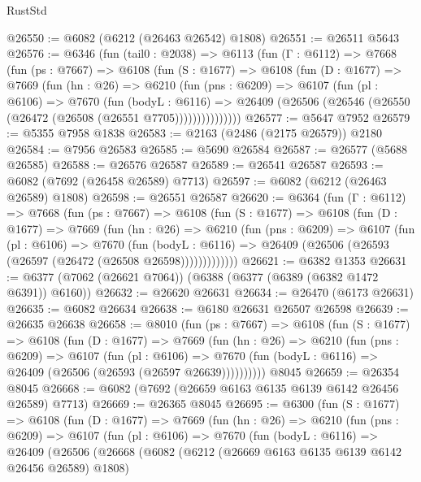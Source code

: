 \begin{lexlean}{RustStd}
\begin{coremodule}
@26550 := @6082 (@6212 (@26463 @26542) @1808)
@26551 := @26511 @5643
@26576 := @6346
    (fun (tail0 : @2038) =>
    @6113
      (fun (Γ : @6112) =>
      @7668
        (fun (ps : @7667) =>
        @6108
          (fun (S : @1677) =>
          @6108
            (fun (D : @1677) =>
            @7669
              (fun (hn : @26) =>
              @6210
                (fun (pns : @6209) =>
                @6107
                  (fun (pl : @6106) =>
                  @7670
                    (fun (bodyL : @6116) =>
                    @26409 (@26506 (@26546 (@26550 (@26472 (@26508 (@26551 @7705)))))))))))))))
@26577 := @5647 @7952
@26579 := @5355 @7958 @1838
@26583 := @2163 (@2486 (@2175 @26579)) @2180
@26584 := @7956 @26583
@26585 := @5690 @26584
@26587 := @26577 (@5688 @26585)
@26588 := @26576 @26587
@26589 := @26541 @26587
@26593 := @6082 (@7692 (@26458 @26589) @7713)
@26597 := @6082 (@6212 (@26463 @26589) @1808)
@26598 := @26551 @26587
@26620 := @6364
    (fun (Γ : @6112) =>
    @7668
      (fun (ps : @7667) =>
      @6108
        (fun (S : @1677) =>
        @6108
          (fun (D : @1677) =>
          @7669
            (fun (hn : @26) =>
            @6210
              (fun (pns : @6209) =>
              @6107
                (fun (pl : @6106) =>
                @7670
                  (fun (bodyL : @6116) =>
                  @26409 (@26506 (@26593 (@26597 (@26472 (@26508 @26598)))))))))))))
@26621 := @6382 @1353
@26631 := @6377 (@7062 (@26621 @7064)) (@6388 (@6377 (@6389 (@6382 @1472 @6391)) @6160))
@26632 := @26620 @26631
@26634 := @26470 (@6173 @26631)
@26635 := @6082 @26634
@26638 := @6180 @26631 @26507 @26598
@26639 := @26635 @26638
@26658 := @8010
    (fun (ps : @7667) =>
    @6108
      (fun (S : @1677) =>
      @6108
        (fun (D : @1677) =>
        @7669
          (fun (hn : @26) =>
          @6210
            (fun (pns : @6209) =>
            @6107
              (fun (pl : @6106) =>
              @7670 (fun (bodyL : @6116) => @26409 (@26506 (@26593 (@26597 @26639))))))))))
    @8045
@26659 := @26354 @8045
@26668 := @6082 (@7692 (@26659 @6163 @6135 @6139 @6142 @26456 @26589) @7713)
@26669 := @26365 @8045
@26695 := @6300
    (fun (S : @1677) =>
    @6108
      (fun (D : @1677) =>
      @7669
        (fun (hn : @26) =>
        @6210
          (fun (pns : @6209) =>
          @6107
            (fun (pl : @6106) =>
            @7670
              (fun (bodyL : @6116) =>
              @26409
                (@26506
                  (@26668
                    (@6082
                      (@6212 (@26669 @6163 @6135 @6139 @6142 @26456 @26589) @1808)

\end{coremodule}
\end{lexlean}
